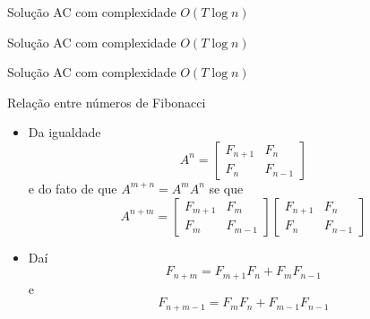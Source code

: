 \begin{frame}[fragile]{Solução AC com complexidade $O(T\log n)$}
\end{frame}

\begin{frame}[fragile]{Solução AC com complexidade $O(T\log n)$}
\end{frame}

\begin{frame}[fragile]{Solução AC com complexidade $O(T\log n)$}
\end{frame}

\begin{frame}[fragile]{Relação entre números de Fibonacci}

    \begin{itemize}
        \item Da igualdade
        \[
            A^n = \begin{bmatrix} F_{n + 1} & F_n \\ F_n & F_{n - 1}\end{bmatrix} 
        \]
        e do fato de que $A^{m + n} = A^mA^n$ se que
        \[
            A^{n + m} = \begin{bmatrix} F_{m + 1} & F_m \\ F_m & F_{m - 1}\end{bmatrix} 
            \begin{bmatrix} F_{n + 1} & F_n \\ F_n & F_{n - 1}\end{bmatrix} 
        \]

        \item Daí
        \[
            F_{n + m} = F_{m + 1}F_n + F_mF_{n - 1}
        \]
        e
        \[
            F_{n + m - 1} = F_mF_n + F_{m - 1}F_{n - 1}
        \]
    \end{itemize}

\end{frame}

